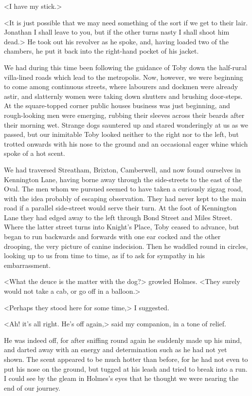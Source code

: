 <I have my stick.>

<It is just possible that we may need something of the sort if we get to their lair. Jonathan I shall leave to you, but if the other turns nasty I shall shoot him dead.> He took out his revolver as he spoke, and, having loaded two of the chambers, he put it back into the right-hand pocket of his jacket.

We had during this time been following the guidance of Toby down the half-rural villa-lined roads which lead to the metropolis. Now, however, we were beginning to come among continuous streets, where labourers and dockmen were already astir, and slatternly women were taking down shutters and brushing door-steps. At the square-topped corner public houses business was just beginning, and rough-looking men were emerging, rubbing their sleeves across their beards after their morning wet. Strange dogs sauntered up and stared wonderingly at us as we passed, but our inimitable Toby looked neither to the right nor to the left, but trotted onwards with his nose to the ground and an occasional eager whine which spoke of a hot scent.

We had traversed Streatham, Brixton, Camberwell, and now found ourselves in Kennington Lane, having borne away through the side-streets to the east of the Oval. The men whom we pursued seemed to have taken a curiously zigzag road, with the idea probably of escaping observation. They had never kept to the main road if a parallel side-street would serve their turn. At the foot of Kennington Lane they had edged away to the left through Bond Street and Miles Street. Where the latter street turns into Knight's Place, Toby ceased to advance, but began to run backwards and forwards with one ear cocked and the other drooping, the very picture of canine indecision. Then he waddled round in circles, looking up to us from time to time, as if to ask for sympathy in his embarrassment.

<What the deuce is the matter with the dog?> growled Holmes. <They surely would not take a cab, or go off in a balloon.>

<Perhaps they stood here for some time,> I suggested.

<Ah! it's all right. He's off again,> said my companion, in a tone of relief.

He was indeed off, for after sniffing round again he suddenly made up his mind, and darted away with an energy and determination such as he had not yet shown. The scent appeared to be much hotter than before, for he had not even to put his nose on the ground, but tugged at his leash and tried to break into a run. I could see by the gleam in Holmes's eyes that he thought we were nearing the end of our journey.

